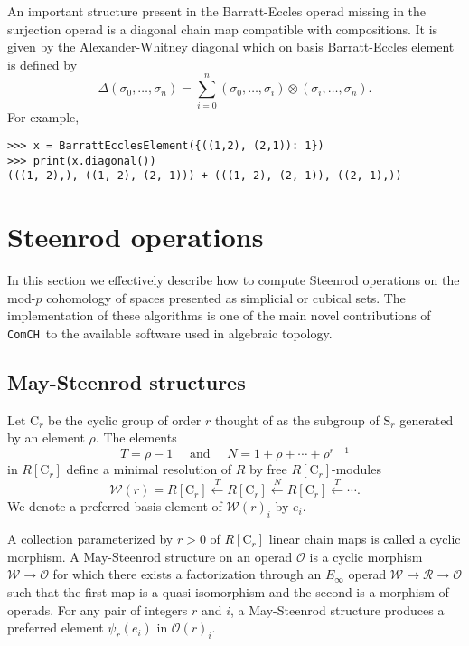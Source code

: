 \documentclass{amsart}
\renewcommand{\S}{\mathrm{S}}
\newcommand{\C}{\mathrm{C}}
\newcommand{\comch}{\texttt{ComCH}}
\begin{document}
An important structure present in the Barratt-Eccles operad missing in the surjection operad is a diagonal chain map compatible with compositions.
It is given by the Alexander-Whitney diagonal which on basis Barratt-Eccles element is defined by
\begin{equation*}
\Delta(\sigma_0, \dots, \sigma_n) = \sum_{i=0}^n (\sigma_0, \dots, \sigma_i) \otimes (\sigma_i, \dots, \sigma_n).
\end{equation*}
For example,

\begin{Verbatim}[frame=lines, samepage=true]
>>> x = BarrattEcclesElement({((1,2), (2,1)): 1})
>>> print(x.diagonal())
(((1, 2),), ((1, 2), (2, 1))) + (((1, 2), (2, 1)), ((2, 1),))
\end{Verbatim}

\section{Steenrod operations} \label{s: steenrod operations}

In this section we effectively describe how to compute Steenrod operations on the mod-$p$ cohomology of spaces presented as simplicial or cubical sets.
The implementation of these algorithms is one of the main novel contributions of \comch\, to the available software used in algebraic topology.

\subsection{May-Steenrod structures}

Let $\C_r$ be the cyclic group of order $r$ thought of as the subgroup of $\S_r$ generated by an element $\rho$.
The elements
\begin{equation*}
T = \rho-1 \quad \text{ and } \quad N = 1+\rho+\cdots+\rho^{r-1}
\end{equation*}
in $R[\C_r]$ define a minimal resolution of $R$ by free $R[\C_r]$-modules
\begin{equation*}
\mathcal W(r) = R[\C_r] \stackrel{T}{\longleftarrow} R[\C_r] \stackrel{N}{\longleftarrow} R[\C_r] \stackrel{T}{\longleftarrow} \cdots.
\end{equation*}
We denote a preferred basis element of $\mathcal W(r)_i$ by $e_i$.

A collection parameterized by $r > 0$ of $R[\C_r]$ linear chain maps is called a cyclic morphism. 
A May-Steenrod structure on an operad $\mathcal O$ is a cyclic morphism $\mathcal W \to \mathcal O$ for which there exists a factorization through an $E_\infty$ operad $\mathcal W \to \mathcal R \to \mathcal O$ such that the first map is a quasi-isomorphism and the second is a morphism of operads.
For any pair of integers $r$ and $i$, a May-Steenrod structure produces a preferred element $\psi_r(e_i)$ in $\mathcal O(r)_i$.
\end{document}
